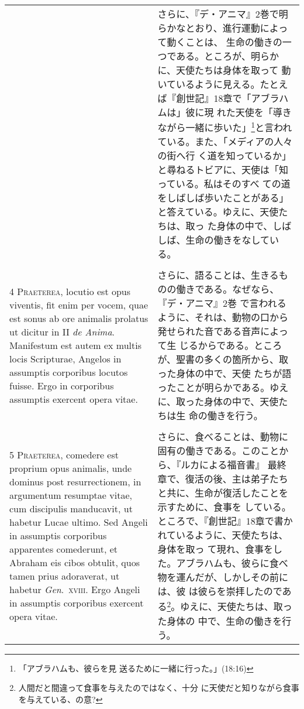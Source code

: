 \documentclass[10pt]{jsarticle} %
\begin{document}
\begin{longtable}{p{21em}p{21em}}
&

 さらに、『デ・アニマ』2巻で明らかなとおり、進行運動によって動くことは、
 生命の働きの一つである。ところが、明らかに、天使たちは身体を取って
 動いているように見える。たとえば『創世記』18章で「アブラハムは」彼に現
 れた天使を「導きながら一緒に歩いた」\footnote{「アブラハムも、彼らを見
 送るために一緒に行った。」(18:16)}と言われている。また、「メディアの人々の街へ行
 く道を知っているか」と尋ねるトビアに、天使は「知っている。私はそのすべ
 ての道をしばしば歩いたことがある」と答えている。ゆえに、天使たちは、取っ
 た身体の中で、しばしば、生命の働きをなしている。

\\\\


{\scshape 4 Praeterea}, locutio est opus viventis, fit
enim per vocem, quae est sonus ab ore animalis prolatus ut dicitur in II
{\itshape de Anima}. Manifestum est autem ex multis locis Scripturae, Angelos in
assumptis corporibus locutos fuisse. Ergo in corporibus assumptis
exercent opera vitae.

 &

 さらに、語ることは、生きるものの働きである。なぜなら、『デ・アニマ』2巻
 で言われるように、それは、動物の口から発せられた音である音声によって生
 じるからである。ところが、聖書の多くの箇所から、取った身体の中で、天使
 たちが語ったことが明らかである。ゆえに、取った身体の中で、天使たちは生
 命の働きを行う。

\\\\



{\scshape 5 Praeterea}, comedere est proprium opus animalis, unde dominus post
resurrectionem, in argumentum resumptae vitae, cum discipulis manducavit, ut
habetur Lucae ultimo. Sed Angeli in assumptis corporibus apparentes comederunt,
et Abraham eis cibos obtulit, quos tamen prius adoraverat, ut habetur {\itshape
Gen}.~{\scshape xviii}. Ergo Angeli in assumptis corporibus exercent opera
vitae.

 &

 さらに、食べることは、動物に固有の働きである。このことから、『ルカによる福音書』
 最終章で、復活の後、主は弟子たちと共に、生命が復活したことを示すために、食事を
 している。ところで、『創世記』18章で書かれているように、天使たちは、身体を取っ
 て現れ、食事をした。アブラハムも、彼らに食べ物を運んだが、しかしその前には、彼
 は彼らを崇拝したのである\footnote{人間だと間違って食事を与えたのではなく、十分
 に天使だと知りながら食事を与えている、の意?}。ゆえに、天使たちは、取った身体の
 中で、生命の働きを行う。


\end{longtable}
\end{document}
